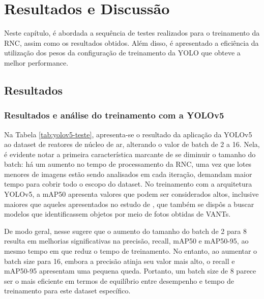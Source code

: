 \chapter{Resultados e Discussão}


Neste capítulo, é abordada a sequência de testes realizados para o treinamento da RNC, assim como os resultados obtidos. Além disso, é apresentado a eficiência da utilização dos pesos da configuração de treinamento da YOLO que obteve a melhor performance. 

\section{Resultados} 

\subsection{Resultados e análise do treinamento com a YOLOv5}

Na Tabela \ref{tab:yolov5-teste}, apresenta-se o resultado da aplicação da YOLOv5 ao dataset de reatores de núcleo de ar, alterando o valor de batch de 2 a 16. Nela, é evidente notar a primeira característica marcante de se diminuir o tamanho do batch: há um aumento no tempo de processamento da RNC, uma vez que lotes menores de imagens estão sendo analisados em cada iteração, demandam maior tempo para cobrir todo o escopo do dataset. No treinamento com a arquitetura YOLOv5, a mAP50 apresenta valores que podem ser considerados altos, inclusive maiores que aqueles apresentados no estudo de , que também se dispôs a buscar modelos que identificassem objetos por meio de fotos obtidas de VANTs.

De modo geral, nesse sugere que o aumento do tamanho do batch de 2 para 8 resulta em melhorias significativas na precisão, recall, mAP50 e mAP50-95, ao mesmo tempo em que reduz o tempo de treinamento. No entanto, ao aumentar o batch size para 16, embora a precisão atinja seu valor mais alto, o recall e mAP50-95 apresentam uma pequena queda. Portanto, um batch size de 8 parece ser o mais eficiente em termos de equilíbrio entre desempenho e tempo de treinamento para este dataset específico.

